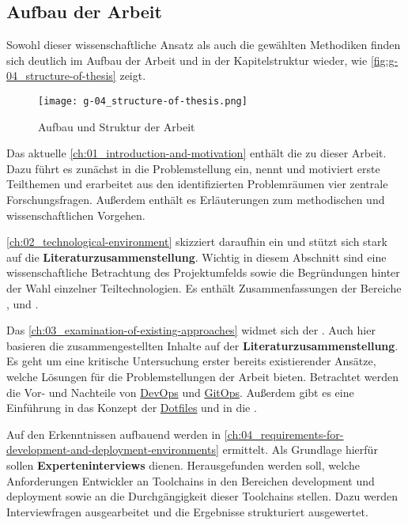 \subsection{Aufbau der Arbeit}
\label{subsec:01-05-02_structure-of-the-thesis}

Sowohl dieser wissenschaftliche Ansatz als auch die gewählten Methodiken finden sich deutlich im Aufbau der Arbeit und in der Kapitelstruktur wieder, wie \autoref{fig:g-04_structure-of-thesis} zeigt.

\begin{figure}[h]
    \centering
    \texttt{[image: g-04\_structure-of-thesis.png]}
    \caption{Aufbau und Struktur der Arbeit}
    \label{fig:g-04_structure-of-thesis}
\end{figure}

Das aktuelle \autoref{ch:01_introduction-and-motivation} enthält die  zu dieser Arbeit. Dazu führt es zunächst in die Problemstellung ein, nennt und motiviert erste Teilthemen und erarbeitet aus den identifizierten Problemräumen vier zentrale Forschungsfragen. Außerdem enthält es Erläuterungen zum methodischen und wissenschaftlichen Vorgehen.

\pagebreak[4]

\autoref{ch:02_technological-environment} skizziert daraufhin ein  und stützt sich stark auf die \textbf{Literaturzusammenstellung}. Wichtig in diesem Abschnitt sind eine wissenschaftliche Betrachtung des Projektumfelds sowie die Begründungen hinter der Wahl einzelner Teiltechnologien. Es enthält Zusammenfassungen der Bereiche ,  und .

Das \autoref{ch:03_examination-of-existing-approaches} widmet sich der . Auch hier basieren die zusammengestellten Inhalte auf der \textbf{Literaturzusammenstellung}. Es geht um eine kritische Untersuchung erster bereits existierender Ansätze, welche Lösungen für die Problemstellungen der Arbeit bieten. Betrachtet werden die Vor- und Nachteile von \hyperref[sec:03-01_devops]{DevOps} und \hyperref[sec:03-03_gitops]{GitOps}. Außerdem gibt es eine Einführung in das Konzept der \hyperref[sec:03-04_dotfiles]{Dotfiles} und in die \hyperref[sec:03-05_concept-of-twelve-factor-app]{}.

Auf den Erkenntnissen aufbauend werden  in \autoref{ch:04_requirements-for-development-and-deployment-environments} ermittelt. Als Grundlage hierfür sollen \textbf{Experteninterviews} dienen. Herausgefunden werden soll, welche Anforderungen Entwickler an Toolchains in den Bereichen \Gls{development} und \Gls{deployment} sowie an die Durchgängigkeit dieser Toolchains stellen. Dazu werden Interviewfragen ausgearbeitet und die Ergebnisse strukturiert ausgewertet.

